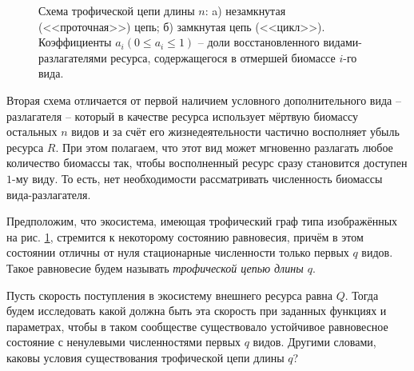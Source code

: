 \begin{figure}[H]
\caption{Схема трофической цепи длины \(n\): a) незамкнутая (<<проточная>>) цепь; б) замкнутая цепь (<<цикл>>). Коэффициенты \(a_i (0 \leq a_i \leq 1)\) -- доли восстановленного видами-разлагателями ресурса, содержащегося в отмершей биомассе \(i\)-го вида.} \label{shemas}
\end{figure}

Вторая схема отличается от первой наличием условного дополнительного вида -- разлагателя -- который в качестве ресурса использует мёртвую биомассу остальных \(n\) видов и за счёт его жизнедеятельности частично восполняет убыль ресурса \(R\). При этом полагаем, что этот вид может мгновенно разлагать любое количество биомассы так, чтобы восполненный ресурс сразу становится доступен \(1\)-му виду. То есть, нет необходимости рассматривать численность биомассы вида-разлагателя.

Предположим, что экосистема, имеющая трофический граф типа изображённых на рис. \ref{shemas}, стремится к некоторому состоянию равновесия, причём в этом состоянии отличны от нуля стационарные численности только первых \(q\) видов. Такое равновесие будем называть \textit{трофической цепью длины \(q\)}. 

Пусть скорость поступления в экосистему внешнего ресурса равна \(Q\). Тогда будем исследовать какой должна быть эта скорость при заданных функциях и параметрах, чтобы в таком сообществе существовало устойчивое равновесное состояние с ненулевыми численностями первых \(q\) видов. Другими словами, каковы условия существования трофической цепи длины \(q\)?


